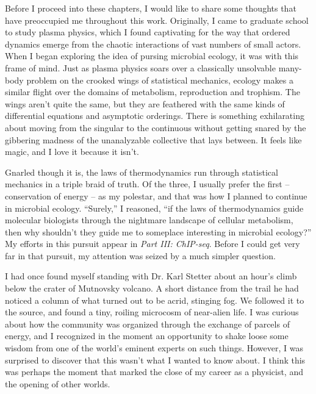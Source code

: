 Before I proceed into these chapters, I would like to share some thoughts that have preoccupied me throughout this work. Originally, I came to graduate school to study plasma physics, which I found captivating for the way that ordered dynamics emerge from the chaotic interactions of vast numbers of small actors. When I began exploring the idea of pursing microbial ecology, it was with this frame of mind. Just as plasma physics soars over a classically unsolvable many-body problem on the crooked wings of statistical mechanics, ecology makes a similar flight over the domains of metabolism, reproduction and trophism. The wings aren't quite the same, but they are feathered with the same kinds of differential equations and asymptotic orderings. There is something exhilarating about moving from the singular to the continuous without getting snared by the gibbering madness of the unanalyzable collective that lays between. It feels like magic, and I love it because it isn't.

Gnarled though it is, the laws of thermodynamics run through statistical mechanics in a triple braid of truth. Of the three, I usually prefer the first -- conservation of energy -- as my polestar, and that was how I planned to continue in microbial ecology. 	``Surely,'' I reasoned, ``if the laws of thermodynamics guide molecular biologists through the nightmare landscape of cellular metabolism, then why shouldn't they guide me to someplace interesting in microbial ecology?'' My efforts in this pursuit appear in {\em Part III: ChIP-seq}. Before I could get very far in that pursuit, my attention was seized by a much simpler question.

I had once found myself standing with Dr. Karl Stetter about an hour's climb below the crater of Mutnovsky volcano. A short distance from the trail he had noticed a column of what turned out to be acrid, stinging fog. We followed it to the source, and found a tiny, roiling microcosm of near-alien life. I was curious about how the community was organized through the exchange of parcels of energy, and I recognized in the moment an opportunity to shake loose some wisdom from one of the world's eminent experts on such things. However, I was surprised to discover that this wasn't what I wanted to know about. I think this was perhaps the moment that marked the close of my career as a physicist, and the opening of other worlds.

